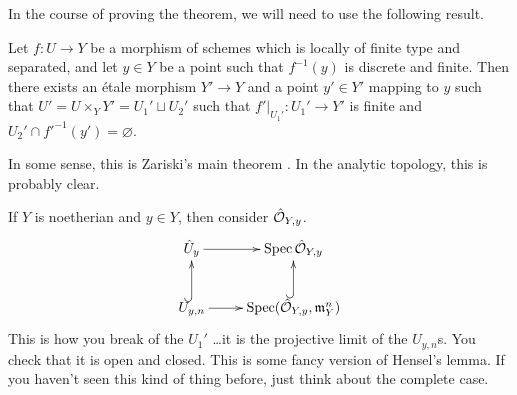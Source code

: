  In the course of proving the theorem, we will need to use the following result.
 \begin{proposition}
   Let $f:U\to Y$ be a morphism of schemes which is locally of finite type and separated,
   and let $y\in Y$ be a point such that $f^{-1}(y)$ is discrete and finite. Then there
   exists an \'etale morphism $Y'\to Y$ and a point $y'\in Y'$ mapping to $y$ such that
   $U'=U\times_Y Y'=U_1'\sqcup U_2'$ such that $f'|_{U_1'}:U_1'\to Y'$ is finite and
   $U_2'\cap f'^{-1}(y')=\varnothing$.
 \end{proposition}
 In some sense, this is Zariski's main theorem .
  In the analytic topology, this is probably clear. 
 \begin{remark}[Aside]
   If $Y$ is noetherian and $y\in Y$, then consider $\hat {\mathcal{O}}_{Y,y}$.
   \[\xymatrix{
   \hat U_y \ar[r] & \spec \hat \O_{Y,y} \\
   U_{y,n}\ar@{^(->}[u]\ar[r] & \spec (\hat \O_{Y,y},\m_Y^n) \ar@{^(->}[u]
   }\]
    This is how you break of the $U_1'$ \dots it is the projective limit of the
   $U_{y,n}$s. You check that it is open and closed. This is some fancy version of
   Hensel's lemma. If you haven't seen this kind of thing before, just think about the
   complete case.
 \end{remark}

